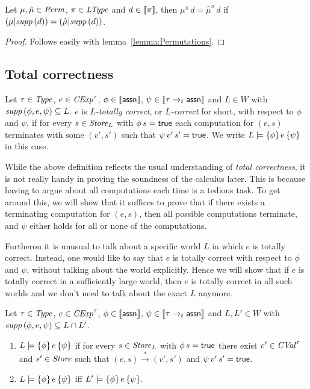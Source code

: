 \documentclass[12pt,a4paper]{report}
\newcommand{\CExp}{\nstyle{CExp}}
\newcommand{\CVal}{\nstyle{CVal}}
\begin{document}
\begin{lemma} \label{lemma:Permutations_and_semantic_domains}
  Let $\mu,\hat{\mu}\in\mathit{Perm}$, $\pi\in\mathit{LType}$ and $d \in \llbracket\pi\rrbracket$, then
  $\mu^\pi\,d = \hat{\mu}^\pi\,d$ if
  $(\mu|\mathit{supp}\,(d)) = (\hat{\mu}|\mathit{supp}\,(d))$.
\end{lemma}

\begin{proof}
  Follows easily with lemma~\ref{lemma:Permutations}.
\end{proof}



\subsection{Total correctness}

\begin{definition}
  Let $\tau\in\mathit{Type}$, $e\in\CExp^\tau$, $\phi\in\llbracket\mathsf{assn}\rrbracket$, $\psi\in\llbracket\tau\rightarrow_t\mathsf{assn}\rrbracket$
  and $L\in W$ with $\mathit{supp}\,(\phi,e,\psi) \subseteq L$.
  $e$ is {\em $L$-totally correct}, or {\em $L$-correct} for short, with respect to $\phi$ and
  $\psi$, if for every $s\in\mathit{Store}_L$ with $\phi\,s=\mathsf{true}$ each computation for $(e,s)$ terminates with some
  $(v',s')$ such that $\psi\,v'\,s'=\mathsf{true}$. We write $L \models \{\phi\}\,e\,\{\psi\}$ in this case.
\end{definition}

While the above definition reflects the usual understanding of {\em total correctness}, it is not really handy
in proving the soundness of the calculus later. This is because having to argue about all computations each
time is a tedious task. To get around this, we will show that it suffices to prove that if there exists a
terminating computation for $(e,s)$, then all possible computations terminate, and $\psi$ either holds for all
or none of the computations.

Furtheron it is unusual to talk about a specific world $L$ in which $e$ is totally correct. Instead, one would
like to say that $e$ is totally correct with respect to $\phi$ and $\psi$, without talking about the world
explicitly. Hence we will show that if $e$ is totally correct in a sufficiently large world, then $e$ is
totally correct in all such worlds and we don't need to talk about the exact $L$ anymore.

\begin{lemma}
  Let $\tau\in\mathit{Type}$, $e\in\CExp^\tau$, $\phi\in\llbracket\mathsf{assn}\rrbracket$, $\psi\in\llbracket\tau\rightarrow_t\mathsf{assn}\rrbracket$
  and $L,L'\in W$ with $\mathit{supp}\,(\phi,e,\psi) \subseteq L \cap L'$.
  \begin{enumerate}
    \item $L\models\{\phi\}\,e\,\{\psi\}$ if for every $s \in \mathit{Store}_L$ with $\phi\,s=\mathsf{true}$ there exist $v'\in\CVal^\tau$ and 
          $s'\in\mathit{Store}$ such that $(e,s) \xrightarrow* (v',s')$ and $\psi\,v'\,s'=\mathsf{true}$.

    \item $L\models\{\phi\}\,e\,\{\psi\}$ iff $L'\models\{\phi\}\,e\,\{\psi\}$.
  \end{enumerate}
\end{lemma}
\end{document}
